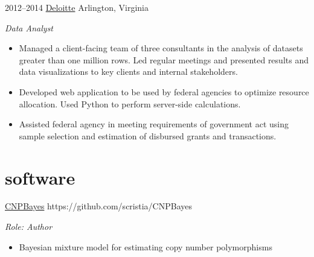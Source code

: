 \documentclass[]{friggeri-cv} %
\begin{document}
\begin{entrylist}
\entry
{2012--2014}
{\href{http://www.deloitte.com/}{Deloitte}}
{Arlington, Virginia}
{\emph{Data Analyst}
\begin{itemize}
\renewcommand\labelitemi{--}
\item Managed a client-facing team of three consultants in the analysis of datasets greater than one million rows. 
Led regular meetings and presented results and data visualizations to key clients and internal stakeholders.
\item Developed web application to be used by federal agencies to optimize resource allocation. 
Used Python to perform server-side calculations.
\item Assisted federal agency in meeting requirements of government act using sample selection and estimation of disbursed grants and transactions.
\end{itemize}
}
\end{entrylist}


\section{software}
\begin{entrylist}
\entry
{}
{\href{https://github.com/scristia/CNPBayes}{CNPBayes}}
{https://github.com/scristia/CNPBayes}
{\emph{Role: Author}
\begin{itemize}
\renewcommand\labelitemi{--}
\item Bayesian mixture model for estimating copy number polymorphisms
\end{itemize}
}
\end{entrylist}
\end{document}
